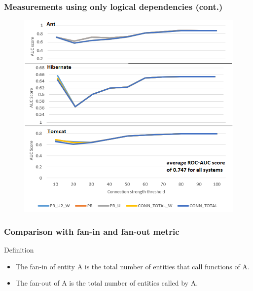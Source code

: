 \documentclass{beamer}
\begin{document}
 \begin{frame}
\frametitle{Measurements using only logical dependencies (cont.) }
 \begin{center}
     \begin{figure}
	\includegraphics[scale=0.68]{ld_measurements.png}
     \end{figure}
\end{center}
\end{frame}


 \begin{frame}
\frametitle{Comparison with fan-in and fan-out metric}
\begin{block}{Definition}


\begin{itemize}
\item The fan-in of entity A is the total number of entities that call functions of A.
\item The fan-out of A is the total number of entities called by A.
\end{itemize}

\end{block}
\end{frame}


\end{document}
